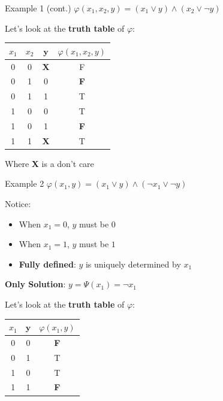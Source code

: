 \documentclass[aspectratio=169]{beamer}
\begin{document}
\begin{frame}{Example 1 (cont.)}
$\varphi(x_1, x_2, y) = (x_1 \lor y) \land (x_2 \lor \neg y)$
\bigskip

Let's look at the \textbf{truth table} of \(\varphi\):

\begin{tabular}{|c|c|c|c|}
    \hline
    $x_1$ & $x_2$ & $\mathbf{y}$ & $\varphi(x_1, x_2, y)$ \\
    \hline
    0 & 0 & \textbf{X} & F\\
    0 & 1 & 0 & \textbf{F}\\
    0 & 1 & 1 & T\\
    1 & 0 & 0 & T\\
    1 & 0 & 1 & \textbf{F}\\
    1 & 1 & \textbf{X} & T\\
    \hline
\end{tabular}
\bigskip

Where \textbf{X} is a don't care
\end{frame}

\begin{frame}{Example 2}
$\varphi(x_1, y) = (x_1 \lor y) \land (\neg x_1 \lor \neg y)$
\bigskip

Notice:
\begin{itemize}
    \item When $x_1 = 0$, $y$ must be $0$
    \item When $x_1 = 1$, $y$ must be $1$
    \item \textbf{Fully defined}: $y$ is uniquely determined by $x_1$
\end{itemize}
\bigskip

\textbf{Only Solution}: $y = \Psi(x_1) = \neg x_1$
\bigskip

Let's look at the \textbf{truth table} of \(\varphi\):
\begin{tabular}{|c|c|c|}
    \hline
    $x_1$ & $\mathbf{y}$ & $\varphi(x_1, y)$ \\
    \hline
    0 & 0 & \textbf{F}\\
    0 & 1 & T\\
    1 & 0 & T\\
    1 & 1 & \textbf{F}\\
    \hline
\end{tabular}
\end{frame}
\end{document}
